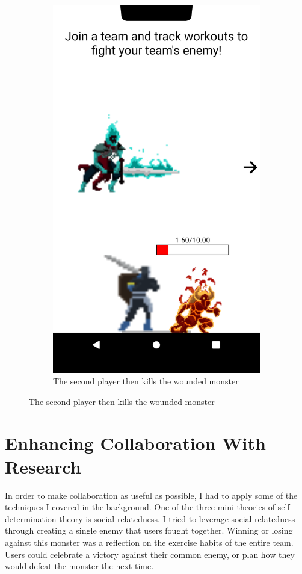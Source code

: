 \documentclass{l4proj}
\begin{document}
\begin{figure}[H]
\begin{subfigure}{0.45\textwidth}
        \includegraphics[width=\textwidth]{lower_attack.png}
        \caption{The second player then kills the wounded monster} 
    \end{subfigure}
\end{figure}

\section{Enhancing Collaboration With Research} \label{enhancing}
In order to make collaboration as useful as possible, I had to apply some of the techniques I covered in the background. One of the three mini theories of self determination theory is social relatedness. I tried to leverage social relatedness through creating a single enemy that users fought together. Winning or losing against this monster was a reflection on the exercise habits of the entire team. Users could celebrate a victory against their common enemy, or plan how they would defeat the monster the next time.
\end{document}
